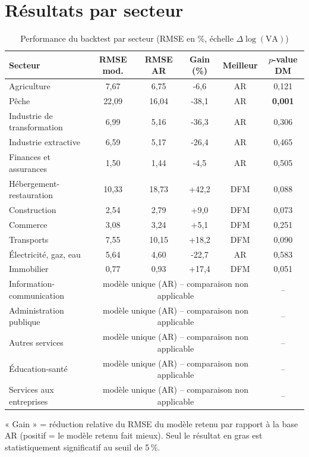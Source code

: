 \documentclass[11pt,a4paper]{report}
\newcommand{\dlogva}{$\Delta\log(\mathrm{VA})$}
\begin{document}
\section{Résultats par secteur}

\begin{table}[H]
\centering
\small
\caption{Performance du backtest par secteur (RMSE en \%, échelle \dlogva{})}
\label{tab:eval}
\begin{tabular}{lccccc}
\toprule
Secteur & RMSE mod. & RMSE AR & Gain (\%) & Meilleur & $p$-value DM \\
\midrule
Agriculture                 & 7,67  & 6,75  & -6,6  & AR      & 0,121 \\
Pêche                       & 22,09 & 16,04 & -38,1 & AR      & \textbf{0,001} \\
Industrie de transformation & 6,99  & 5,16  & -36,3 & AR      & 0,306 \\
Industrie extractive        & 6,59  & 5,17  & -26,4 & AR      & 0,465 \\
Finances et assurances      & 1,50  & 1,44  & -4,5  & AR      & 0,505 \\
Hébergement-restauration    & 10,33 & 18,73 & +42,2 & DFM     & 0,088 \\
Construction                 & 2,54  & 2,79  & +9,0  & DFM     & 0,073 \\
Commerce                     & 3,08  & 3,24  & +5,1  & DFM     & 0,251 \\
Transports                   & 7,55  & 10,15 & +18,2 & DFM     & 0,090 \\
Électricité, gaz, eau        & 5,64  & 4,60  & -22,7 & AR      & 0,583 \\
Immobilier                   & 0,77  & 0,93  & +17,4 & DFM     & 0,051 \\
Information-communication    & \multicolumn{4}{c}{modèle unique (AR) -- comparaison non applicable} & -- \\
Administration publique      & \multicolumn{4}{c}{modèle unique (AR) -- comparaison non applicable} & -- \\
Autres services               & \multicolumn{4}{c}{modèle unique (AR) -- comparaison non applicable} & -- \\
Éducation-santé               & \multicolumn{4}{c}{modèle unique (AR) -- comparaison non applicable} & -- \\
Services aux entreprises      & \multicolumn{4}{c}{modèle unique (AR) -- comparaison non applicable} & -- \\
\bottomrule
\end{tabular}
\end{table}
\vspace{-0.2cm}
{\footnotesize « Gain » = réduction relative du RMSE du modèle retenu par rapport à la base AR (positif = le modèle retenu fait mieux). Seul le résultat en gras est statistiquement significatif au seuil de 5\,\%.}
\end{document}
